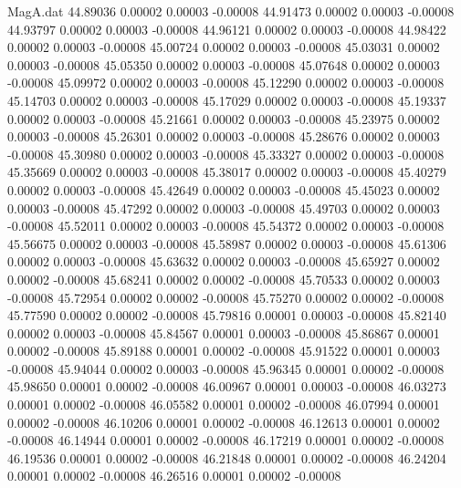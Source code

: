 \begin{filecontents}{MagA.dat}
  44.89036    0.00002    0.00003   -0.00008
  44.91473    0.00002    0.00003   -0.00008
  44.93797    0.00002    0.00003   -0.00008
  44.96121    0.00002    0.00003   -0.00008
  44.98422    0.00002    0.00003   -0.00008
  45.00724    0.00002    0.00003   -0.00008
  45.03031    0.00002    0.00003   -0.00008
  45.05350    0.00002    0.00003   -0.00008
  45.07648    0.00002    0.00003   -0.00008
  45.09972    0.00002    0.00003   -0.00008
  45.12290    0.00002    0.00003   -0.00008
  45.14703    0.00002    0.00003   -0.00008
  45.17029    0.00002    0.00003   -0.00008
  45.19337    0.00002    0.00003   -0.00008
  45.21661    0.00002    0.00003   -0.00008
  45.23975    0.00002    0.00003   -0.00008
  45.26301    0.00002    0.00003   -0.00008
  45.28676    0.00002    0.00003   -0.00008
  45.30980    0.00002    0.00003   -0.00008
  45.33327    0.00002    0.00003   -0.00008
  45.35669    0.00002    0.00003   -0.00008
  45.38017    0.00002    0.00003   -0.00008
  45.40279    0.00002    0.00003   -0.00008
  45.42649    0.00002    0.00003   -0.00008
  45.45023    0.00002    0.00003   -0.00008
  45.47292    0.00002    0.00003   -0.00008
  45.49703    0.00002    0.00003   -0.00008
  45.52011    0.00002    0.00003   -0.00008
  45.54372    0.00002    0.00003   -0.00008
  45.56675    0.00002    0.00003   -0.00008
  45.58987    0.00002    0.00003   -0.00008
  45.61306    0.00002    0.00003   -0.00008
  45.63632    0.00002    0.00003   -0.00008
  45.65927    0.00002    0.00002   -0.00008
  45.68241    0.00002    0.00002   -0.00008
  45.70533    0.00002    0.00003   -0.00008
  45.72954    0.00002    0.00002   -0.00008
  45.75270    0.00002    0.00002   -0.00008
  45.77590    0.00002    0.00002   -0.00008
  45.79816    0.00001    0.00003   -0.00008
  45.82140    0.00002    0.00003   -0.00008
  45.84567    0.00001    0.00003   -0.00008
  45.86867    0.00001    0.00002   -0.00008
  45.89188    0.00001    0.00002   -0.00008
  45.91522    0.00001    0.00003   -0.00008
  45.94044    0.00002    0.00003   -0.00008
  45.96345    0.00001    0.00002   -0.00008
  45.98650    0.00001    0.00002   -0.00008
  46.00967    0.00001    0.00003   -0.00008
  46.03273    0.00001    0.00002   -0.00008
  46.05582    0.00001    0.00002   -0.00008
  46.07994    0.00001    0.00002   -0.00008
  46.10206    0.00001    0.00002   -0.00008
  46.12613    0.00001    0.00002   -0.00008
  46.14944    0.00001    0.00002   -0.00008
  46.17219    0.00001    0.00002   -0.00008
  46.19536    0.00001    0.00002   -0.00008
  46.21848    0.00001    0.00002   -0.00008
  46.24204    0.00001    0.00002   -0.00008
  46.26516    0.00001    0.00002   -0.00008

\end{filecontents}
